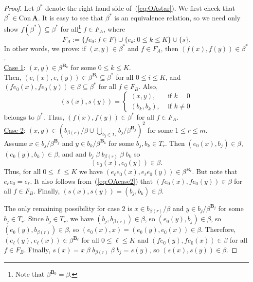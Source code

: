 \documentclass[cm,dissertation]{uhthesis}
\theoremstyle{plain}
\theoremstyle{definition}
\theoremstyle{remark}
\numberwithin{theorem}{section}
\numberwithin{claim}{chapter}
\numberwithin{equation}{section}
\numberwithin{conjecture}{chapter}
\newcommand{\<}{\ensuremath{\langle}}
\renewcommand{\>}{\ensuremath{\rangle}}
\renewcommand{\leq}{\ensuremath{\leqslant}}
\newcommand{\Con}{\ensuremath{\mathrm{Con\,}}}
\newcommand{\0}{\ensuremath{\mathbf{0}}}
\newcommand{\1}{\ensuremath{\mathbf{1}}}
\newcommand{\2}{\ensuremath{\mathbf{2}}}
\newcommand{\3}{\ensuremath{\mathbf{3}}}
\newcommand{\4}{\ensuremath{\mathbf{4}}}
\newcommand{\5}{\ensuremath{\mathbf{5}}}
\newcommand{\bA}{\ensuremath{\mathbf{A}}}
\newcommand{\bB}{\ensuremath{\mathbf{B}}}
\begin{document}
\begin{proof} 
  Let $\beta^*$ denote the right-hand side of~(\ref{eq:OAstar}).  
  We first check that $\beta^*\in \Con\bA$. 
  It is easy to see that $\beta^*$ is an equivalence relation, so we need only
  show $f(\beta^*) \subseteq \beta^*$ for all\footnote{Note that $\beta^{\bB_0} = \beta$.} 
  $f\in F_A$, where 
  \[
  F_A := \{f e_0 : f\in F\} \cup \{e_k : 0\leq k \leq K\} \cup \{s\}.
  \] 
  In other words, we prove: if 
  $(x,y)\in \beta^*$ and $f\in F_A$, then $(f(x), f(y))\in \beta^*$.\\[6pt]
  \underline{Case 1}:  $(x,y)\in \beta^{\bB_k}$ for some $0\leq k\leq K$. \\[4pt] Then,
  $(e_i(x),e_i(y))\in \beta^{\bB_i} \subseteq \beta^*$ for all $0\leq i\leq K$,
  and $(f e_0(x),f e_0(y))\in \beta \subseteq \beta^*$ for all $f \in F_B$. Also,
  \[
  (s(x),s(y))= 
  \begin{cases}
    (x,y), & \text{ if $k=0$}\\
    (b_k,b_k), & \text{ if $k\neq 0$}
  \end{cases} %
  \]
  belongs to $\beta^*$.  Thus, $(f(x), f(y))\in \beta^*$ for all $f\in F_A$.\\[6pt]
  \underline{Case 2}: 
  $(x,y) \in \left(b_{\beta(r)}/\beta \cup \bigcup_{b_j\in T_r}
  b_j/\beta^{\bB_j}\right)^2$ for some $1\leq r\leq m$.\\[4pt]
  Assume $x\in b_j/\beta^{\bB_j}$ and $y\in b_k/\beta^{\bB_k}$ for some $b_j, b_k
  \in T_r$.  Then $(e_0(x), b_j) \in \beta$, 
  $(e_0(y), b_k) \in \beta$, and and $b_j\;\beta\; b_{\beta(r)}\; \beta\; b_k$ so 
  \begin{equation}
    \label{eq:OAcase2}
    (e_0(x), e_0(y)) \in \beta.
  \end{equation}
  Thus, for all $0\leq \ell \leq K$ we have 
  $(e_\ell e_0(x), e_\ell e_0(y)) \in \beta^{\bB_\ell}$.  But note that $e_\ell
  e_0 = e_\ell$.  It also follows from~(\ref{eq:OAcase2}) that $(f e_0(x), f
  e_0(y))\in \beta$ for all $f\in F_B$.  Finally, 
  $(s(x),s(y))=(b_j, b_k) \in \beta$.

  The only remaining possibility for case 2 is $x\in b_{\beta(r)}/\beta$ and $y\in
  b_j/\beta^{\bB_j}$ for some $b_j\in T_r$.  Since $b_j\in T_r$, we have
  $(b_j,b_{\beta(r)})\in \beta$, so 
  $(e_0(y), b_j) \in \beta$, so 
  $(e_0(y), b_{\beta(r)}) \in \beta$, so 
  $(e_0(x), x) = (e_0(y), e_0(x)) \in \beta$.
  Therefore, $(e_\ell(y), e_\ell(x)) \in \beta^{\bB_\ell}$ for all $0\leq \ell \leq K$ and 
  $(f e_0(y), f e_0(x)) \in \beta$ for all $f\in F_B$. Finally, $s(x) = x \;\beta\;
  b_{\beta(r)}\; \beta \;b_j = s(y)$, so $(s(x),s(y)) \in \beta$.


\end{proof}
\end{document}
